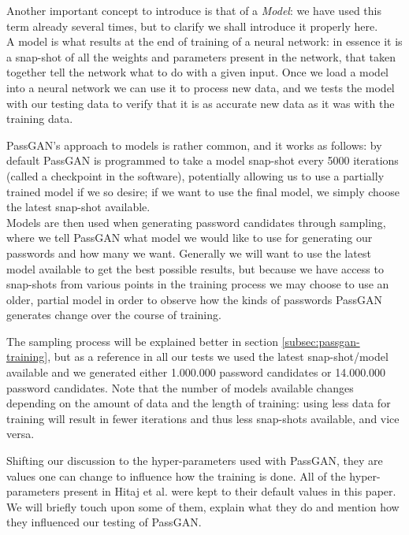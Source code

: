 Another important concept to introduce is that of a \emph{Model}: we have used this term already several times, but to clarify we shall introduce it properly here.\\
A model is what results at the end of training of a neural network: in essence it is a snap-shot of all the weights and parameters present in the network, that taken together tell the network what to do with a given input. Once we load a model into a neural network we can use it to process new data, and we tests the model with our testing data to verify that it is as accurate new data as it was with the training data.

PassGAN's approach to models is rather common, and it works as follows: by default PassGAN is programmed to take a model snap-shot every 5000 iterations (called a checkpoint in the software), potentially allowing us to use a partially trained model if we so desire; if we want to use the final model, we simply choose the latest snap-shot available.\\
Models are then used when generating password candidates through sampling, where we tell PassGAN what model we would like to use for generating our passwords and how many we want. Generally we will want to use the latest model available to get the best possible results, but because we have access to snap-shots from various points in the training process we may choose to use an older, partial model in order to observe how the kinds of passwords PassGAN generates change over the course of training.

The sampling process will be explained better in section \ref{subsec:passgan-training}, but as a reference in all our tests we used the latest snap-shot/model available and we generated either 1.000.000 password candidates or 14.000.000 password candidates.
Note that the number of models available changes depending on the amount of data and the length of training: using less data for training will result in fewer iterations and thus less snap-shots available, and vice versa.

Shifting our discussion to the hyper-parameters used with PassGAN, they are values one can change to influence how the training is done. All of the hyper-parameters present in Hitaj et al. \cite{PassGAN} were kept to their default values in this paper. We will briefly touch upon some of them, explain what they do and mention how they influenced our testing of PassGAN.


